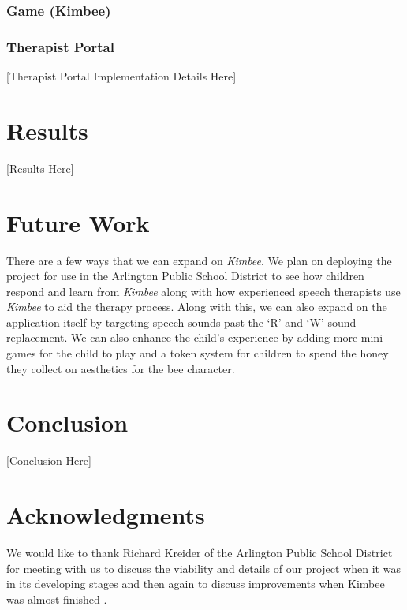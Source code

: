 \documentclass{sig-alternate-2013}
\begin{document}
\subsubsection{Game (Kimbee)}



\subsubsection{Therapist Portal}

[Therapist Portal Implementation Details Here]

\section{Results}

[Results Here]

\section{Future Work}

There are a few ways that we can expand on {\em Kimbee}. We plan on deploying the project for use in the Arlington Public School District to see how children respond and learn from {\em Kimbee} along with how experienced speech therapists use {\em Kimbee} to aid the therapy process. Along with this, we can also expand on the application itself by targeting speech sounds past the `R' and `W' sound replacement. We can also enhance the child's experience by adding more mini-games for the child to play and a token system for children to spend the honey they collect on aesthetics for the bee character.

\section{Conclusion}

[Conclusion Here]

\section{Acknowledgments}

We would like to thank Richard Kreider of the Arlington Public School District for meeting with us to discuss the viability and details of our project when it was in its developing stages and then again to discuss improvements when Kimbee was almost finished \cite{Kreider:Intro,Kreider:Results}.




\balancecolumns
\end{document}
